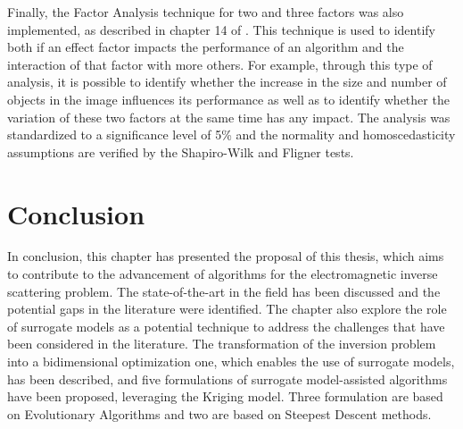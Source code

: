 			Finally, the Factor Analysis technique for two and three factors was also implemented, as described in chapter 14 of \citep{montgomery2010applied}. This technique is used to identify both if an effect factor impacts the performance of an algorithm and the interaction of that factor with more others. For example, through this type of analysis, it is possible to identify whether the increase in the size and number of objects in the image influences its performance as well as to identify whether the variation of these two factors at the same time has any impact. The analysis was standardized to a significance level of 5\% and the normality and homoscedasticity assumptions are verified by the Shapiro-Wilk and Fligner tests.
	
	\section{Conclusion}\label{chap:proposed-methodology:conclusion}
	
		In conclusion, this chapter has presented the proposal of this thesis, which aims to contribute to the advancement of algorithms for the electromagnetic inverse scattering problem. The state-of-the-art in the field has been discussed and the potential gaps in the literature were identified. The chapter also explore the role of surrogate models as a potential technique to address the challenges that have been considered in the literature. The transformation of the inversion problem into a bidimensional optimization one, which enables the use of surrogate models, has been described, and five formulations of surrogate model-assisted algorithms have been proposed, leveraging the Kriging model. Three formulation are based on Evolutionary Algorithms and two are based on Steepest Descent methods.
		
